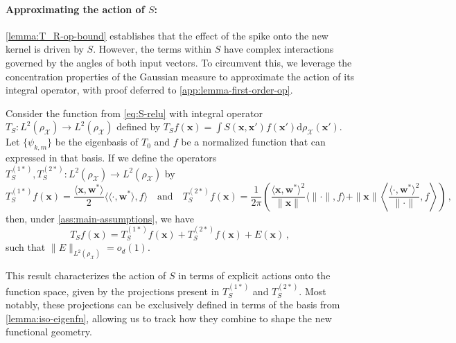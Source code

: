 \paragraph{Approximating the action of $S$:} \cref{lemma:T_R-op-bound} establishes that the effect of the spike onto the new kernel is driven by $S$. However, the terms within $S$ have complex interactions governed by the angles of both input vectors. To circumvent this, we leverage the concentration properties of the Gaussian measure to approximate the action of its integral operator, with proof deferred to \cref{app:lemma-first-order-op}. 
\begin{lemma}\label{lemma:approx-first-order-op}
    Consider the function from \cref{eq:S-relu} with integral operator $T_S: L^2(\rho_{\mathcal X}) \to L^2(\rho_{\mathcal X})$ defined by $T_S f(\bm x) = \int S(\bm x, \bm x') f(\bm x') \mathrm d \rho_{\mathcal X}(\bm x')$. Let $\{\psi_{k, m}\}$ be the eigenbasis of $T_0$ and $f$ be a normalized function that can expressed in that basis. If we define the operators $ T_{S}^{(1*)}, T_{S}^{(2*)} : L^2(\rho_{\mathcal X}) \to L^2(\rho_{\mathcal X})$ by
    \[
        T_{S}^{(1*)} f(\bm x) = \frac{\langle \bm x, \bm w^*\rangle}{2}\langle\langle \cdot, \bm w^*\rangle,f\rangle \quad \text{and} \quad
        T_{S}^{(2*)} f(\bm x) = \frac{1}{2\pi}\left(\frac{\langle \bm x, \bm w^*\rangle^2}{\|\bm x\|} \langle \|\cdot\|, f\rangle + \|\bm x \| \left\langle \frac{\langle \cdot, \bm w^*\rangle^2}{\|\cdot\|}, f \right\rangle \right)\, ,
    \]
    then, under \cref{ass:main-assumptions}, we have 
    \[
        T_S f(\bm x) = T_{S}^{(1*)} f(\bm x) + T_{S}^{(2*)} f(\bm x) + E(\bm x)\, ,
    \] such that $\|E\|_{L^2(\rho_{\mathcal X})} = o_d(1)$.
\end{lemma}
This result characterizes the action of $S$ in terms of explicit actions onto the function space, given by the projections present in $T_S^{(1*)}$ and $T_S^{(2*)}$. Most notably, these projections can be exclusively defined in terms of the basis from \cref{lemma:iso-eigenfn}, allowing us to track how they combine to shape the new functional geometry.

